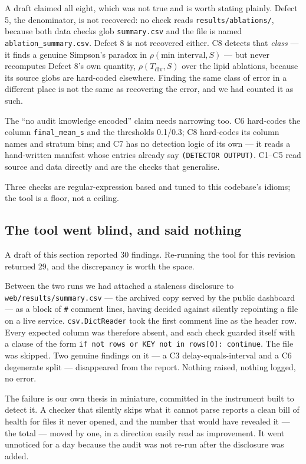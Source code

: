 \documentclass[11pt,letterpaper]{article}
\begin{document}
A draft claimed all eight, which was not true and is worth stating
plainly. Defect 5, the denominator, is not recovered: no check reads
\texttt{results/ablations/}, because both data checks glob
\texttt{summary.csv} and the file is named
\texttt{ablation\_summary.csv}. Defect 8 is not recovered either. C8
detects that \emph{class} --- it finds a genuine Simpson's paradox in
$\rho(\text{min interval}, S)$ --- but never recomputes Defect 8's own
quantity, $\rho(T_{\mathrm{div}}, S)$ over the lipid ablations, because
its source globs are hard-coded elsewhere. Finding the same class of
error in a different place is not the same as recovering the error, and
we had counted it as such.

The ``no audit knowledge encoded'' claim needs narrowing too. C6
hard-codes the column \texttt{final\_mean\_s} and the thresholds
0.1/0.3; C8 hard-codes its column names and stratum bins; and C7 has no
detection logic of its own --- it reads a hand-written manifest whose
entries already say \texttt{(DETECTOR OUTPUT)}. C1--C5 read source and
data directly and are the checks that generalise.

Three checks are regular-expression based and tuned to this codebase's
idioms; the tool is a floor, not a ceiling.

\subsection{The tool went blind, and said nothing}

A draft of this section reported 30 findings. Re-running the tool for
this revision returned 29, and the discrepancy is worth the space.

Between the two runs we had attached a staleness disclosure to
\texttt{web/results/summary.csv} --- the archived copy served by the
public dashboard --- as a block of \texttt{\#} comment lines, having
decided against silently repointing a file on a live service.
\texttt{csv.DictReader} took the first comment line as the header row.
Every expected column was therefore absent, and each check guarded
itself with a clause of the form \texttt{if not rows or KEY not in
rows[0]: continue}. The file was skipped. Two genuine findings on it ---
a C3 delay-equals-interval and a C6 degenerate split --- disappeared
from the report. Nothing raised, nothing logged, no error.

The failure is our own thesis in miniature, committed in the instrument
built to detect it. A checker that silently skips what it cannot parse
reports a clean bill of health for files it never opened, and the number
that would have revealed it --- the total --- moved by one, in a
direction easily read as improvement. It went unnoticed for a day
because the audit was not re-run after the disclosure was added.
\end{document}
